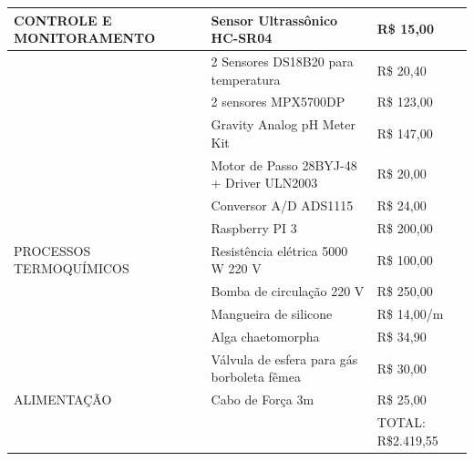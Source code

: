 \begin{table}[h]
{\begin{tabular}{ll|l|}
\multicolumn{1}{|l|}{CONTROLE E MONITORAMENTO} & Sensor Ultrassônico HC-SR04                                                                 & R\$ 15,00          \\ \hline
\multicolumn{1}{|l|}{}                         & 2 Sensores DS18B20 para temperatura                                                         & R\$ 20,40          \\ \hline
\multicolumn{1}{|l|}{}                         & 2 sensores MPX5700DP                                                                        & R\$ 123,00         \\ \hline
\multicolumn{1}{|l|}{}                         & Gravity Analog pH Meter Kit                                                                 & R\$ 147,00         \\ \hline
\multicolumn{1}{|l|}{}                         & Motor de Passo 28BYJ-48 + Driver ULN2003                                                    & R\$ 20,00          \\ \hline
\multicolumn{1}{|l|}{}                         & Conversor A/D ADS1115                                                                       & R\$ 24,00          \\ \hline
\multicolumn{1}{|l|}{}                         & Raspberry PI 3                                                                              & R\$ 200,00         \\ \hline
\multicolumn{1}{|l|}{PROCESSOS TERMOQUÍMICOS}  & Resistência elétrica 5000 W 220 V                                                           & R\$ 100,00         \\ \hline
\multicolumn{1}{|l|}{}                         & Bomba de circulação 220 V                                                                   & R\$ 250,00         \\ \hline
\multicolumn{1}{|l|}{}                         & Mangueira de silicone                                                                       & R\$ 14,00/m        \\ \hline
\multicolumn{1}{|l|}{}                         & Alga chaetomorpha                                                                           & R\$ 34,90          \\ \hline
\multicolumn{1}{|l|}{}                         & Válvula de esfera para gás borboleta fêmea                                                  & R\$ 30,00          \\ \hline
\multicolumn{1}{|l|}{ALIMENTAÇÃO}              & Cabo de Força 3m                                                                            & R\$ 25,00          \\ \hline
                                               &                                                                                             & TOTAL: R\$2.419,55 \\ \cline{3-3}
\end{tabular}
}
\end{table}

